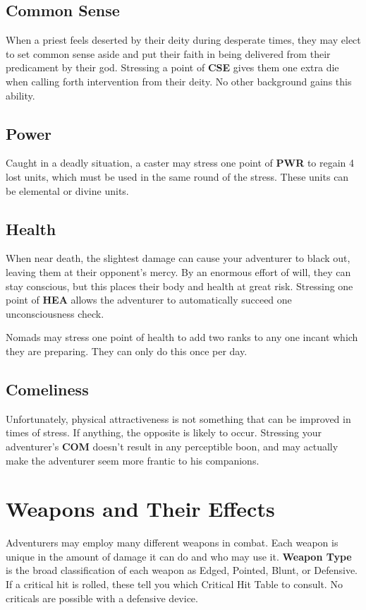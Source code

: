 \begin{multicols*}{2}
\subsection{Common Sense}
When a priest feels deserted by their deity during desperate times, they may elect to set common sense aside and put their faith in being delivered from their predicament by their god. Stressing a point of \textbf{CSE} gives them one extra die when calling forth intervention from their deity. No other background gains this ability.
\subsection{Power}
Caught in a deadly situation, a caster may stress one point of \textbf{PWR} to regain 4 lost units, which must be used in the same round of the stress. These units can be elemental or divine units.
\subsection{Health}
When near death, the slightest damage can cause your adventurer to black out, leaving them at their opponent's mercy. By an enormous effort of will, they can stay conscious, but this places their body and health at great risk. Stressing one point of \textbf{HEA} allows the adventurer to automatically succeed one unconsciousness check.

Nomads may stress one point of health to add two ranks to any one incant which they are preparing. They can only do this once per day.
\subsection{Comeliness}
Unfortunately, physical attractiveness is not something that can be improved in times of stress. If anything, the opposite is likely to occur. Stressing your adventurer's \textbf{COM} doesn't result in any perceptible boon, and may actually make the adventurer seem more frantic to his companions.
\section{Weapons and Their Effects}
Adventurers may employ many different weapons in combat. Each weapon is unique in the amount of damage it can do and who may use it.
\textbf{Weapon Type} is the broad classification of each
weapon as Edged, Pointed, Blunt, or Defensive. If a critical hit is rolled, these tell you which Critical Hit Table to consult. No criticals are possible with a defensive device.


\end{multicols*}

